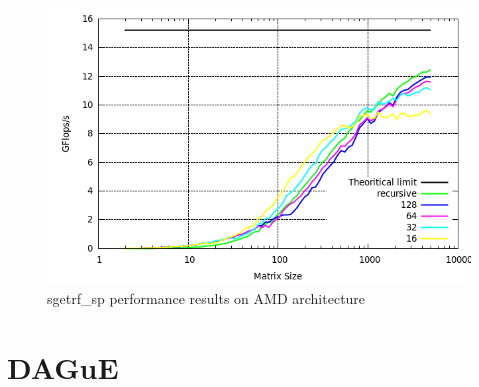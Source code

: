 \documentclass{report}
\begin{document}
\begin{figure}[!h]
\begin{center}
\includegraphics[width=\textwidth]{exp_sgetrf_sp_amd.png} 
\end{center}
\caption{sgetrf\_sp performance results on AMD architecture}
\end{figure}

\chapter{DAGuE}
\end{document}
